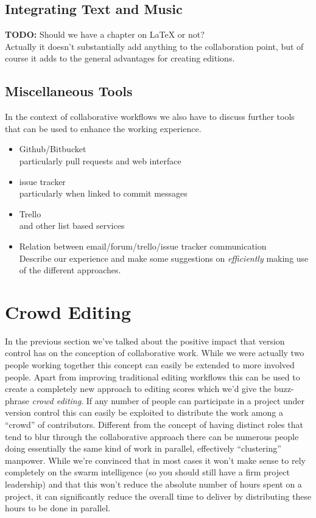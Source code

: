 \documentclass[11pt,a4paper]{article}
\begin{document}
\subsection{Integrating Text and Music}
\textbf{TODO:} Should we have a chapter on LaTeX or not?\\
Actually it doesn't substantially add anything to the collaboration point,
but of course it adds to the general advantages for creating editions.

\subsection{Miscellaneous Tools}
In the context of collaborative workflows we also have to discuss further tools that
can be used to enhance the working experience.

\begin{itemize}
\item Github/Bitbucket\\
particularly pull requests and web interface
\item issue tracker\\
particularly when linked to commit messages
\item Trello\\
and other list based services
\item Relation between email/forum/trello/issue tracker communication\\
Describe our experience and make some suggestions on \emph{efficiently} making use
of the different approaches.
\end{itemize}

\section{Crowd Editing}
In the previous section we've talked about the positive impact that version control
has on the conception of collaborative work. While we were actually two people
working together this concept can easily be extended to more involved people.
Apart from improving traditional editing workflows this can be used to create a
completely new approach to editing scores which we'd give the buzz-phrase \emph{crowd
editing}. If any number of people can participate in a project under version control
this can easily be exploited to distribute the work among a “crowd” of contributors.
Different from the concept of having distinct roles that tend to blur through the
collaborative approach there can be numerous people doing essentially the same kind
of work in parallel, effectively “clustering” manpower. While we're convinced that
in most cases it won't make sense to rely completely on the swarm intelligence (so
you should still have a firm project leadership) and that this won't reduce the
absolute number of hours spent on a project, it can significantly reduce the overall
time to deliver by distributing these hours to be done in parallel.
\end{document}
